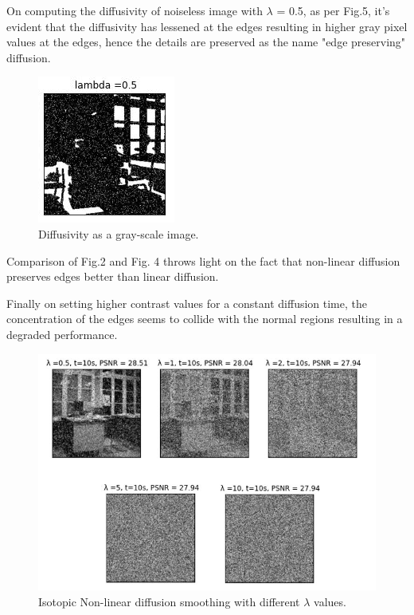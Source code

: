 \documentclass{ipol}
\begin{document}
On computing the diffusivity of noiseless image with $\lambda$ = 0.5, as per Fig.5, it's evident that the diffusivity has lessened at the edges resulting in higher gray pixel values at the edges, hence the details are preserved as the name "edge preserving" diffusion.

\begin{figure}[!htbp]
\begin{center}
\includegraphics[scale=1]{./images/Non_linear_Diffusivity}
\caption{Diffusivity as a gray-scale image.}
\label{fig:example}
\end{center}
\end{figure}

Comparison of Fig.2 and Fig. 4 throws light on the fact that non-linear diffusion preserves edges better than linear diffusion.

Finally on setting higher contrast values for a constant diffusion time, the concentration of the edges seems to collide with the normal regions resulting in a degraded performance.

\begin{figure}[!htbp]
\begin{center}
\includegraphics[scale=0.75]{./images/Non_linear_varingLambda}
\caption{Isotopic Non-linear diffusion smoothing with different  $\lambda$ values.}
\label{fig:example}
\end{center}
\end{figure}
\end{document}
